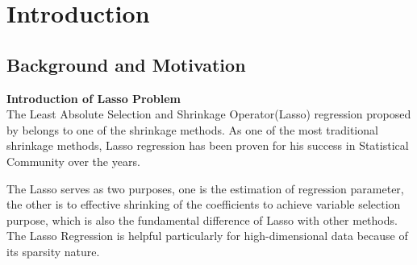 \chapter{Introduction}
\label{Chapter1}
\section{Background and Motivation}



\textbf{Introduction of Lasso Problem}\\
The Least Absolute Selection and Shrinkage Operator(Lasso) regression proposed by \cite{tibshirani_1996} belongs to one of the shrinkage methods. As one of the most traditional shrinkage methods, Lasso regression has been proven for his success in Statistical Community over the years.

The Lasso serves as two purposes, one is the estimation of regression parameter, the other is to effective shrinking of the coefficients to achieve variable selection purpose, which is also the fundamental difference of Lasso with other methods. The Lasso Regression is helpful particularly for high-dimensional data because of its sparsity nature.

